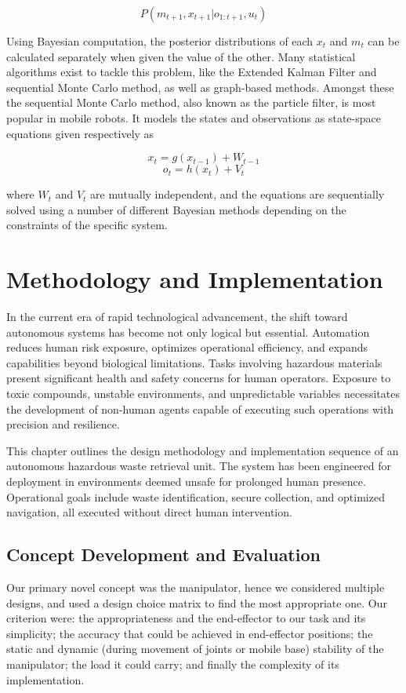 \documentclass{article}
\begin{document}
$$P(m_{t+1},x_{t+1}|o_{1:t+1},u_{t})$$

Using Bayesian computation, the posterior distributions of each $x_{t}$ and $m_{t}$ can be calculated separately when given the value of the other. Many statistical algorithms exist to tackle this problem, like the Extended Kalman Filter and sequential Monte Carlo method, as well as graph-based methods. Amongst these the sequential Monte Carlo method, also known as the particle filter, is most popular in mobile robots. It models the states and observations as state-space equations given respectively as

$$x_{t}=g(x_{t-1})+W_{t-1}$$
$$o_{t}=h(x_{t})+V_{t}$$

where $W_{t}$ and $V_{t}$ are mutually independent, and the equations are sequentially solved using a number of different Bayesian methods depending on the constraints of the specific system.

\section{Methodology and Implementation}

In the current era of rapid technological advancement, the shift toward autonomous systems has become not only logical but essential. Automation reduces human risk exposure, optimizes operational efficiency, and expands capabilities beyond biological limitations. Tasks involving hazardous materials present significant health and safety concerns for human operators. Exposure to toxic compounds, unstable environments, and unpredictable variables necessitates the development of non-human agents capable of executing such operations with precision and resilience.

This chapter outlines the design methodology and implementation sequence of an autonomous hazardous waste retrieval unit. The system has been engineered for deployment in environments deemed unsafe for prolonged human presence. Operational goals include waste identification, secure collection, and optimized navigation, all executed without direct human intervention.

\subsection{Concept Development and Evaluation}

Our primary novel concept was the manipulator, hence we considered multiple designs, and used a design choice matrix to find the most appropriate one. Our criterion were: the appropriateness and the end-effector to our task and its simplicity; the accuracy that could be achieved in end-effector positions; the static and dynamic (during movement of joints or mobile base) stability of the manipulator; the load it could carry; and finally the complexity of its implementation.
\end{document}
